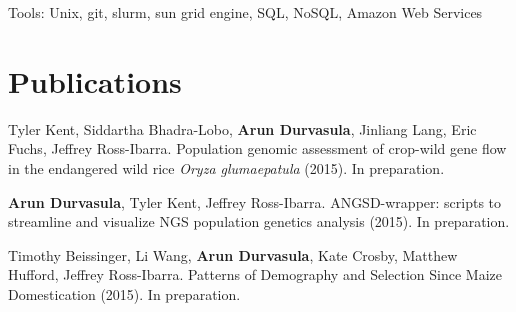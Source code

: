 \documentclass[letterpaper]{article}
\renewenvironment{itemize}{
  \begin{list}{}{
    \setlength{\leftmargin}{1em}
  }
}{
  \end{list}
}
\begin{document}
\begin{itemize}
\item Tools: Unix, git, slurm, sun grid engine, SQL, NoSQL, Amazon Web Services
\end{itemize}


\setlength\parskip{0.15em}

\section*{Publications}
\begin{itemize}
\item Tyler Kent, Siddartha Bhadra-Lobo, {\bf Arun Durvasula}, Jinliang Lang, Eric Fuchs, Jeffrey Ross-Ibarra. Population genomic assessment of crop-wild gene flow in the endangered wild rice \emph{Oryza glumaepatula} (2015). In preparation.
\item {\bf Arun Durvasula}, Tyler Kent, Jeffrey Ross-Ibarra. ANGSD-wrapper: scripts to streamline and visualize NGS population genetics analysis (2015). In preparation. %
\item Timothy Beissinger, Li Wang,  {\bf Arun Durvasula}, Kate Crosby, Matthew Hufford, Jeffrey Ross-Ibarra. Patterns of Demography and Selection Since Maize Domestication (2015). In preparation.
\end{itemize}
\end{document}
